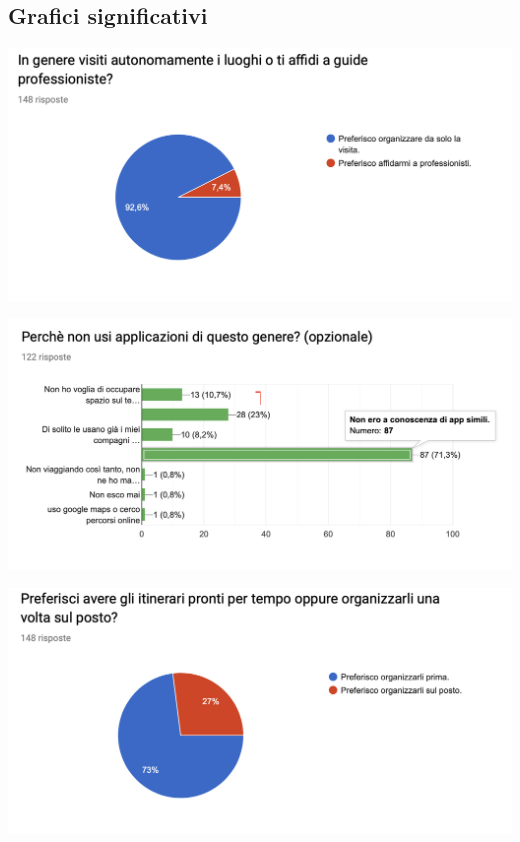 \newpage

\subsection{Grafici significativi}

\begin{center}
    \includegraphics[width=14cm]{../questionnaires/chart1.png}
\end{center}


\begin{center}
    \includegraphics[width=14cm]{../questionnaires/chart2.png}
\end{center}


\begin{center}
    \includegraphics[width=14cm]{../questionnaires/chart3.png}
\end{center}